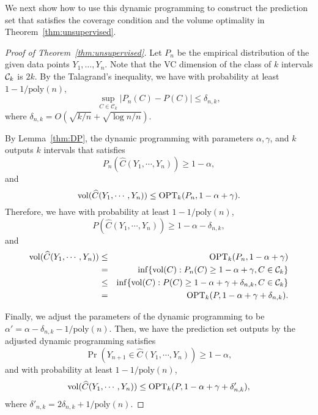 We next show how to use this dynamic programming to construct the prediction set that satisfies the coverage condition and the volume optimality in Theorem~\ref{thm:unsupervised}.

\begin{proof}[Proof of Theorem~\ref{thm:unsupervised}]
Let $P_n$ be the empirical distribution of the given data points $Y_1, \dots, Y_n$. 
Note that the VC dimension of the class of $k$ intervals $\mathcal{C}_k$ is $2k$. 
By the Talagrand's inequality, we have with probability at least $1- 1/\mathrm{poly}(n)$,
$$\sup_{C\in\mathcal{C}_k}|P_n(C)-P(C)| \leq \delta_{n,k},$$
where $\delta_{n,k} = O(\sqrt{k/n} + \sqrt{\log n/n})$.
 
By Lemma~\ref{thm:DP}, the dynamic programming with parameters $\alpha, \gamma$, and $k$ outputs $k$ intervals that satisfies %
$$P_n(\widehat{C}(Y_1,\cdots,Y_n))\geq 1-\alpha,$$
and
$$\mathrm{vol}(\widehat{C}(Y_1,\cdots,Y_n)) \leq \operatorname{OPT}_k(P_n,1-\alpha+\gamma).$$
Therefore, we have with probability at least $1-1/\mathrm{poly}(n)$,
$$P(\widehat{C}(Y_1,\cdots,Y_n))\geq 1-\alpha-\delta_{n,k},$$
and 
\begin{eqnarray*}
\mathrm{vol}(\widehat{C}(Y_1,\cdots,Y_n)) &\leq& \operatorname{OPT}_k(P_n,1-\alpha+\gamma) \\
&=& \inf\{\mathrm{vol}(C):P_n(C)\geq 1-\alpha+\gamma, C\in\mathcal{C}_k\} \\
&\leq& \inf\{\mathrm{vol}(C):P(C)\geq 1-\alpha+\gamma+\delta_{n,k}, C\in\mathcal{C}_k\} \\
&=& \operatorname{OPT}_k(P,1-\alpha+\gamma+\delta_{n,k}).
\end{eqnarray*}

Finally, we adjust the parameters of the dynamic programming to be $\alpha' = \alpha - \delta_{n,k} - 1/\mathrm{poly}(n)$. Then, we have the prediction set outputs by the adjusted dynamic programming satisfies
$$\Pr(Y_{n+1}\in \widehat{C}(Y_1,\cdots,Y_n))\geq 1-\alpha,$$
and with probability at least $1-1/\mathrm{poly}(n)$,
$$\mathrm{vol}(\widehat{C}(Y_1,\cdots,Y_n))\leq \operatorname{OPT}_k(P,1-\alpha+\gamma+\delta'_{n,k}),$$
where $\delta'_{n,k} = 2\delta_{n,k} + 1/\mathrm{poly}(n).$
\end{proof}
\fi


